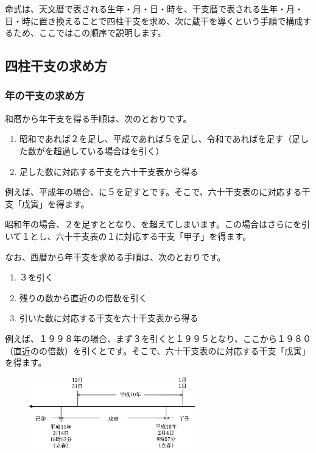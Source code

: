\documentclass[a5paper,11pt,dvipdfmx]{tarticle}
\begin{document}
命式は、天文暦で表される生年・月・日・時を、干支暦で表される生年・月・日・時に置き換えることで四柱干支を求め、次に蔵干を導くという手順で構成するため、ここではこの順序で説明します。

\clearpage

\subsection{四柱干支の求め方}
\subsubsection*{年の干支の求め方}

和暦から年干支を得る手順は、次のとおりです。

\begin{enumerate}
\item 昭和であれば２を足し、平成であれば５を足し、令和であればを足す（足した数がを超過している場合はを引く）
\item 足した数に対応する干支を六十干支表から得る
\end{enumerate}

例えば、平成年の場合、に５を足すとです。そこで、六十干支表のに対応する干支「戊寅」を得ます。

昭和年の場合、２を足すととなり、を超えてしまいます。この場合はさらにを引いて１とし、六十干支表の１に対応する干支「甲子」を得ます。

なお、西暦から年干支を求める手順は、次のとおりです。
\begin{enumerate}
\item ３を引く
\item 残りの数から直近のの倍数を引く
\item 引いた数に対応する干支を六十干支表から得る
\end{enumerate}

例えば、１９９８年の場合、まず３を引くと１９９５となり、ここから１９８０（直近のの倍数）を引くとです。そこで、六十干支表のに対応する干支「戊寅」を得ます。

\begin{figure}
  \includegraphics[width=72mm,angle=90]{figs/figure3-2.eps}
\end{figure}
\end{document}
